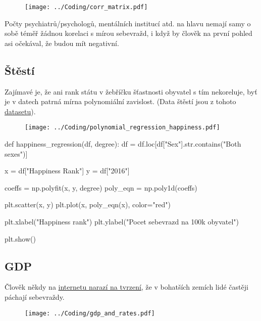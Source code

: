 \documentclass[12pt]{article}
\begin{document}
\begin{figure}[hbt]
  \centering
  \texttt{[image: ../Coding/corr\_matrix.pdf]}
  \label{fig:plot}
\end{figure}

Počty psychiatrů/psychologů, mentálních institucí atd. na hlavu nemají samy o sobě téměř žádnou korelaci s mírou sebevražd, i když by člověk na první pohled asi očekával, že budou mít negativní. 
\subsection{Štěstí}
Zajímavé je, že ani rank státu v žebříčku šťastnosti obyvatel s tím nekoreluje, byť je v datech patrná mírna polynomiální zavislost. (Data štěstí jsou z tohoto \href{https://www.kaggle.com/datasets/unsdsn/world-happiness}{datasetu}). 

\begin{figure}[hbt]
  \centering
  \texttt{[image: ../Coding/polynomial\_regression\_happiness.pdf]}
  \label{fig:plot}
\end{figure}

\begin{python}
def happiness_regression(df, degree):
    df = df.loc[df["Sex"].str.contains("Both sexes")]

    x = df["Happiness Rank"]
    y = df["2016"]

    coeffs = np.polyfit(x, y, degree)
    poly_eqn = np.poly1d(coeffs)

    plt.scatter(x, y)
    plt.plot(x, poly_eqn(x), color="red")

    plt.xlabel("Happiness rank")
    plt.ylabel("Pocet sebevrazd na 100k obyvatel")

    plt.show()
\end{python}

\newpage
\subsection{GDP} Člověk někdy na \href{https://www.youtube.com/watch?v=brEU5j4IsxU}{internetu narazí na tvrzení}, že v bohatších zemích lidé častěji páchají sebevraždy.
\begin{figure}[hbt]
  \centering
  \texttt{[image: ../Coding/gdp\_and\_rates.pdf]}
  \label{fig:plot}
\end{figure}
\end{document}
